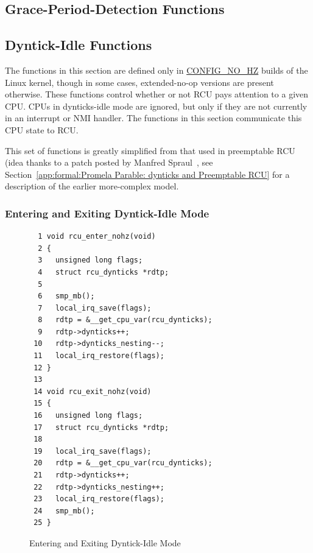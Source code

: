 \subsection{Grace-Period-Detection Functions}
\label{app:rcuimpl:rcutreewt:Grace-Period-Detection Functions}


\subsection{Dyntick-Idle Functions}
\label{app:rcuimpl:rcutreewt:Dyntick-Idle Functions}

The functions in this section are defined only in \url{CONFIG_NO_HZ}
builds of the Linux kernel,
though in some cases, extended-no-op versions are present otherwise.
These functions control whether or not RCU pays attention to a given CPU.
CPUs in dynticks-idle mode are ignored, but only if they are not
currently in an interrupt or NMI handler.
The functions in this section communicate this CPU state to RCU.

This set of functions is greatly simplified from that used in
preemptable RCU (idea thanks to a patch posted by
Manfred Spraul~\cite{ManfredSpraul2008StateMachineRCU},
see
Section~\ref{app:formal:Promela Parable: dynticks and Preemptable RCU}
for a description of the earlier more-complex model.

\subsubsection{Entering and Exiting Dyntick-Idle Mode}
\label{app:rcuimpl:rcutreewt:Entering and Exiting Dyntick-Idle Mode}

\begin{figure}[tbp]
{ \scriptsize
\begin{verbatim}
  1 void rcu_enter_nohz(void)
  2 {
  3   unsigned long flags;
  4   struct rcu_dynticks *rdtp;
  5 
  6   smp_mb();
  7   local_irq_save(flags);
  8   rdtp = &__get_cpu_var(rcu_dynticks);
  9   rdtp->dynticks++;
 10   rdtp->dynticks_nesting--;
 11   local_irq_restore(flags);
 12 }
 13 
 14 void rcu_exit_nohz(void)
 15 {
 16   unsigned long flags;
 17   struct rcu_dynticks *rdtp;
 18 
 19   local_irq_save(flags);
 20   rdtp = &__get_cpu_var(rcu_dynticks);
 21   rdtp->dynticks++;
 22   rdtp->dynticks_nesting++;
 23   local_irq_restore(flags);
 24   smp_mb();
 25 }
\end{verbatim}
}
\caption{Entering and Exiting Dyntick-Idle Mode}
\label{fig:app:rcuimpl:rcutreewt:Entering and Exiting Dyntick-Idle Mode}
\end{figure}

